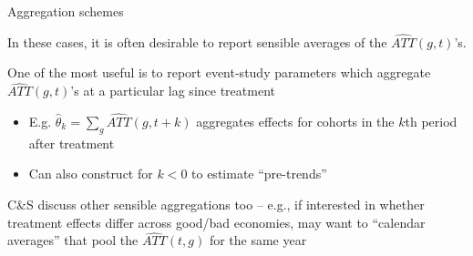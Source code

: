 \documentclass[aspectratio = 169, 13pt]{beamer}
\begin{document}
\begin{frame}{Aggregation schemes}
  \begin{wideitemize}
    \item
    In these cases, it is often desirable to report sensible averages of the $\widehat{ATT}(g,t)$'s.

    \pause
    \item
    One of the most useful is to report event-study parameters which aggregate $\widehat{ATT}(g,t)$'s at a particular lag since treatment
    \begin{itemize}
      \item E.g. $\hat{\theta}_k = \sum_g \widehat{ATT}(g, t+k)$ aggregates effects for cohorts in the $k$th period after treatment

      \item Can also construct for $k<0$ to estimate ``pre-trends''
    \end{itemize}

    \pause
    \item
    C\&S discuss other sensible aggregations too -- e.g., if interested in whether treatment effects differ across good/bad economies, may want to ``calendar averages'' that pool the $\widehat{ATT}(t,g)$ for the same year
  \end{wideitemize}

\end{frame}
\end{document}
